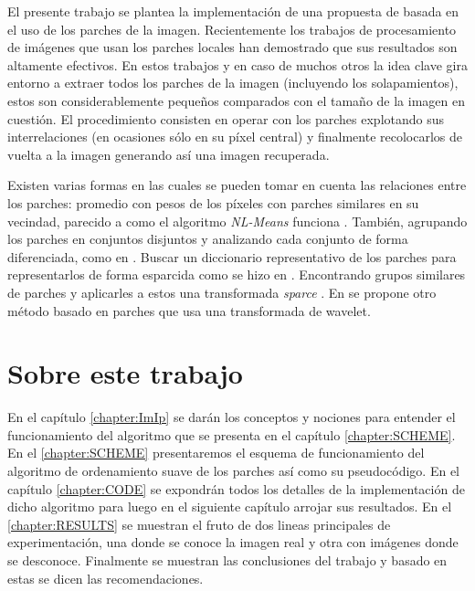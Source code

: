 El presente trabajo se plantea la implementaci\'on de una propuesta de \II\quad basada en el uso de los parches de la imagen. Recientemente los trabajos \cite{buades2005review,chatterjee2009clustering,yu2010image,yu2011solving,dong2011image,dong2011sparsity,zoran2011learning,elad2006image,mairal2007sparse,mairal2009non,zeyde2010single,dabov2007image,li2008patch} de procesamiento de im\'agenes que usan los parches locales han demostrado que sus resultados son altamente efectivos. En estos trabajos y en caso de muchos otros la idea clave gira entorno a extraer todos los parches de la imagen (incluyendo los solapamientos), estos son considerablemente pequeños comparados con el tamaño de la imagen en cuesti\'on. El procedimiento consisten en operar con los parches explotando sus interrelaciones (en ocasiones s\'olo en su p\'ixel central) y finalmente recolocarlos de vuelta a la imagen generando as\'i una imagen recuperada.

Existen varias formas en las cuales se pueden tomar en cuenta las relaciones entre los parches: promedio con pesos de los p\'ixeles con parches similares en su vecindad, parecido a como el algoritmo \textit{NL-Means} funciona \cite{buades2005review}. Tambi\'en, agrupando los parches en conjuntos disjuntos y analizando cada conjunto de forma diferenciada, como en \cite{chatterjee2009clustering,yu2010image,yu2011solving,dong2011image,dong2011sparsity,zoran2011learning}. Buscar un diccionario representativo de los parches para representarlos de forma esparcida como se hizo en \cite{elad2006image,mairal2007sparse,mairal2009non,zeyde2010single}. Encontrando grupos similares de parches y aplicarles a estos una transformada \textit{sparce} \cite{mairal2009non,dabov2007image,li2008patch}. En \cite{ram2011generalized,ram2012redundant} se propone otro m\'etodo basado en parches que usa una transformada de wavelet.

\section*{Sobre este trabajo}

En el cap\'itulo \ref{chapter:ImIp} se dar\'an los conceptos y nociones para entender el funcionamiento del algoritmo que se presenta en el cap\'itulo \ref{chapter:SCHEME}. En el \ref{chapter:SCHEME} presentaremos el esquema de funcionamiento del algoritmo de ordenamiento suave de los parches as\'i como su pseudoc\'odigo. En el cap\'itulo \ref{chapter:CODE} se expondr\'an todos los detalles de la implementaci\'on de dicho algoritmo para luego en el siguiente cap\'itulo  arrojar sus resultados. En el \ref{chapter:RESULTS} se muestran el fruto de dos lineas principales de experimentaci\'on, una donde se conoce la imagen real y otra con imágenes donde se desconoce. Finalmente se muestran las conclusiones del trabajo y basado en estas se dicen las recomendaciones.
